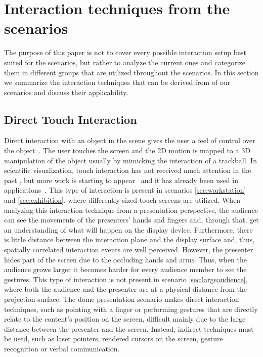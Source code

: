 \documentclass[review,journal]{vgtc}         %
\begin{document}
\section{Interaction techniques from the scenarios} \label{sec:techniques}
The purpose of this paper is not to cover every possible interaction setup best suited for the scenarios, but rather to analyze the current ones and categorize them in different groups that are utilized throughout the scenarios.
In this section we summarize the interaction techniques that can be derived from of our scenarios and discuss their applicability.

\subsection{Direct Touch Interaction}
Direct interaction with an object in the scene gives the user a feel of control over the object~\cite{isenberg2009studying}. 
The user touches the screen and the 2D motion is mapped to a 3D manipulation of the object usually by mimicking the interaction of a trackball.
In scientific visualization, touch interaction has not received much attention in the past \cite{isenberg:hal-00781512}, but more work is starting to appear~\cite{Klein:2012:DSD:2322389.2322403} and it has already been used in applications~\cite{LRFPY11}.
This type of interaction is present in scenarios \ref{sec:workstation} and \ref{sec:exhibition}, where differently sized touch screens are utilized. 
When analyzing this interaction technique from a presentation perspective, the audience can see the movements of the presenters' hands and fingers and, through that, get an understanding of what will happen on the display device.
Furthermore, there is little distance between the interaction plane and the display surface and, thus, spatially correlated interaction events are well perceived.
However, the presenter hides part of the screen due to the occluding hands and arms.
Thus, when the audience grows larger it becomes harder for every audience member to see the gestures.
This type of interaction is not present in scenario \ref{sec:largeaudience}, where both the audience and the presenter are at a physical distance from the projection surface.
The dome presentation scenario makes direct interaction techniques, such as pointing with a finger or performing gestures that are directly relate to the content's position on the screen, difficult mainly due to the large distance between the presenter and the screen.
Instead, indirect techniques must be used, such as laser pointers, rendered cursors on the screen, gesture recognition or verbal communication.
\end{document}
